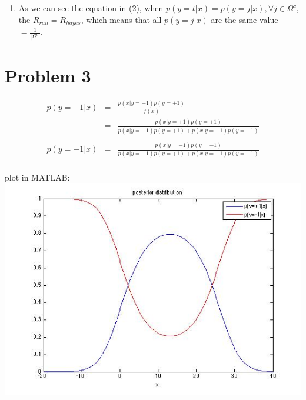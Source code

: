 \documentclass[12pt]{ctexart}
\begin{document}
\begin{enumerate}
\item 
As we can see the equation in (2), when $p(y = t | x) = p(y = j| x), \forall j \in \Omega^c$, the $R_{ran} = R_{hayes}$, which means that all $p(y = j|x)$ are the same value $= \frac{1}{|\Omega^c|}$.
\end{enumerate}

\section{Problem 3}

\begin{eqnarray*}
p(y = +1|x) &=& \frac{p(x|y= +1) p(y=+1)}{f(x)} \\
		 &=& \frac{p(x|y=+1)p(y=+1)}{p(x|y=+1)p(y=+1) + p(x|y=-1)p(y=-1)} \\ 
\\
p(y = -1|x) &=& \frac{p(x|y=-1)p(y=-1)}{p(x|y=+1)p(y=+1) + p(x|y=-1)p(y=-1)} \\ 
\end{eqnarray*}

plot in MATLAB: \\
\includegraphics[scale=0.8]{hw1_prob3_pic1.jpg} \\
\end{document}
